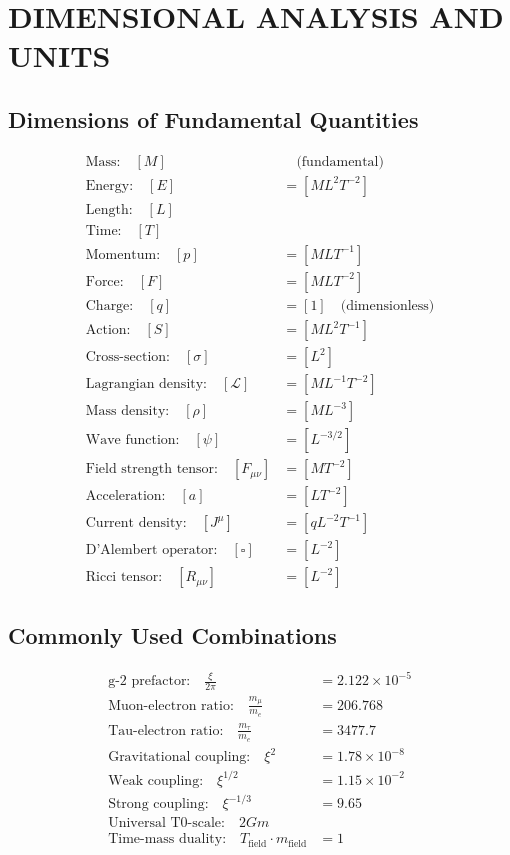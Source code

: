 \documentclass[12pt,a4paper]{article}
\begin{document}
	\section{DIMENSIONAL ANALYSIS AND UNITS}
	
	\subsection{Dimensions of Fundamental Quantities}
	\begin{align}
		\text{Mass:} \quad [M] &\quad \text{(fundamental)} \\
		\text{Energy:} \quad [E] &= [ML^2T^{-2}] \\
		\text{Length:} \quad [L] & \\
		\text{Time:} \quad [T] & \\
		\text{Momentum:} \quad [p] &= [MLT^{-1}] \\
		\text{Force:} \quad [F] &= [MLT^{-2}] \\
		\text{Charge:} \quad [q] &= [1] \quad \text{(dimensionless)} \\
		\text{Action:} \quad [S] &= [ML^2T^{-1}] \\
		\text{Cross-section:} \quad [\sigma] &= [L^2] \\
		\text{Lagrangian density:} \quad [\mathcal{L}] &= [ML^{-1}T^{-2}] \\
		\text{Mass density:} \quad [\rho] &= [ML^{-3}] \\
		\text{Wave function:} \quad [\psi] &= [L^{-3/2}] \\
		\text{Field strength tensor:} \quad [F_{\mu\nu}] &= [MT^{-2}] \\
		\text{Acceleration:} \quad [a] &= [LT^{-2}] \\
		\text{Current density:} \quad [J^\mu] &= [qL^{-2}T^{-1}] \\
		\text{D'Alembert operator:} \quad [\square] &= [L^{-2}] \\
		\text{Ricci tensor:} \quad [R_{\mu\nu}] &= [L^{-2}]
	\end{align}
	
	\subsection{Commonly Used Combinations}
	\begin{align}
		\text{g-2 prefactor:} \quad \frac{\xi}{2\pi} &= 2.122 \times 10^{-5} \\
		\text{Muon-electron ratio:} \quad \frac{m_\mu}{m_e} &= 206.768 \\
		\text{Tau-electron ratio:} \quad \frac{m_\tau}{m_e} &= 3477.7 \\
		\text{Gravitational coupling:} \quad \xi^2 &= 1.78 \times 10^{-8} \\
		\text{Weak coupling:} \quad \xi^{1/2} &= 1.15 \times 10^{-2} \\
		\text{Strong coupling:} \quad \xi^{-1/3} &= 9.65 \\
		\text{Universal T0-scale:} \quad 2Gm & \\
		\text{Time-mass duality:} \quad T_{\text{field}} \cdot m_{\text{field}} &= 1
	\end{align}
	
\end{document}
